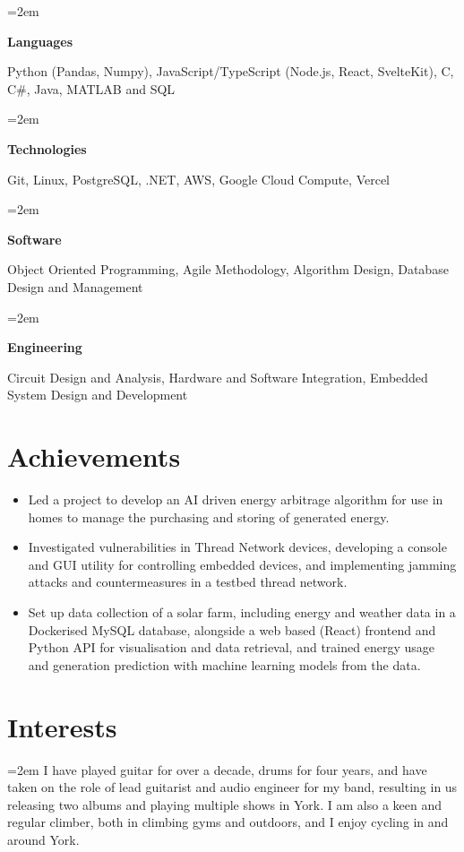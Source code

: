 \documentclass[12pt]{article} %
\newlength{\spacebox}
\newcommand{\skill}[2]{
  \noindent\hangindent=2em\hangafter=0
  \parbox{1.8\spacebox}{%
  \textbf{#1}} %
  {\small #2} \par} %
\newcommand{\interests}[1]{
  \vspace*{0.5em}
  \noindent\hangindent=2em\hangafter=0 \small #1 
}
\begin{document}
\skill{Languages}{Python (Pandas, Numpy), JavaScript/TypeScript (Node.js, React, SvelteKit), C, C\#, Java, MATLAB and SQL}
\skill{Technologies}{Git, Linux, PostgreSQL, .NET, AWS, Google Cloud Compute, Vercel}
\skill{Software}{Object Oriented Programming, Agile Methodology, Algorithm Design, Database Design and Management}
\skill{Engineering}{Circuit Design and Analysis, Hardware and Software Integration, Embedded System Design and Development}

\section*{Achievements}
\begin{itemize}
  \item Led a project to develop an AI driven energy arbitrage algorithm for use in homes to manage the purchasing and storing of generated energy.
  \item Investigated vulnerabilities in Thread Network devices, developing a console and GUI utility for controlling embedded devices, and implementing jamming attacks and countermeasures in a testbed thread network.
  \item Set up data collection of a solar farm, including energy and weather data in a Dockerised MySQL database, alongside a web based (React) frontend and Python API for visualisation and data retrieval, and trained energy usage and generation prediction with machine learning models from the data.
\end{itemize}

\section*{Interests}
\interests{I have played guitar for over a decade, drums for four years, and have taken on the role of lead guitarist and audio engineer for my band, resulting in us releasing two albums and playing multiple shows in York. I am also a keen and regular climber, both in climbing gyms and outdoors, and I enjoy cycling in and around York.}
\end{document}
